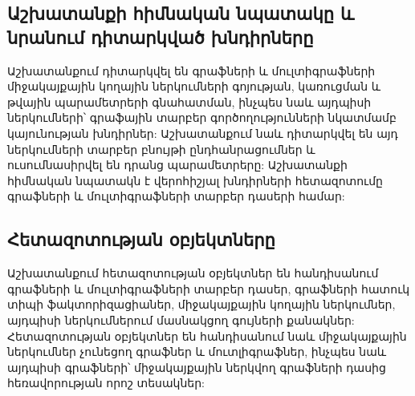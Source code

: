 
\subsection*{Աշխատանքի հիմնական նպատակը և նրանում դիտարկված խնդիրները}
Աշխատանքում դիտարկվել են գրաֆների և մուլտիգրաֆների միջակայքային կողային ներկումների գոյության, կառուցման և թվային պարամետրերի գնահատման, ինչպես նաև այդպիսի ներկումների՝ գրաֆային տարբեր գործողությունների նկատմամբ կայունության խնդիրներ: Աշխատանքում նաև դիտարկվել են այդ ներկումների տարբեր բնույթի ընդհանրացումներ և ուսումնասիրվել են դրանց պարամետրերը: Աշխատանքի հիմնական նպատակն է վերոհիշյալ խնդիրների հետազոտումը գրաֆների և մուլտիգրաֆների տարբեր դասերի համար:


\subsection*{Հետազոտության օբյեկտները}
Աշխատանքում հետազոտության օբյեկտներ են հանդիսանում գրաֆների և մուլտիգրաֆների տարբեր դասեր, գրաֆների հատուկ տիպի ֆակտորիզացիաներ, միջակայքային կողային ներկումներ, այդպիսի ներկումներում մասնակցող գույների քանակներ: Հետազոտության օբյեկտներ են հանդիսանում նաև միջակայքային ներկումներ չունեցող գրաֆներ և մուտլիգրաֆներ, ինչպես նաև այդպիսի գրաֆների՝ միջակայքային ներկվող գրաֆների դասից հեռավորության որոշ տեսակներ:


